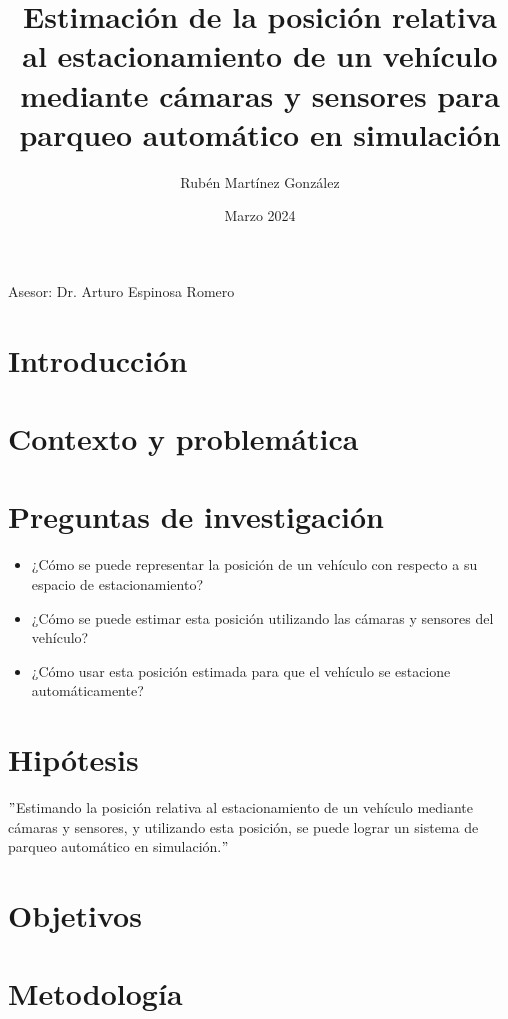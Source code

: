 \documentclass[12pt,letterpaper,final]{article}
\title{Estimación de la posición relativa al estacionamiento de un vehículo mediante cámaras y sensores para parqueo automático en simulación}
\author{Rubén Martínez González}
\date{Marzo 2024}
\begin{document}
    \maketitle
    \begin{center}
        Asesor: Dr. Arturo Espinosa Romero

    \end{center}
    \clearpage

    \section*{Introducción}
    
    \clearpage

    \section*{Contexto y problemática}
    
    \clearpage

    \section*{Preguntas de investigación}
    \begin{itemize}
        \item ¿Cómo se puede representar la posición de un vehículo con respecto a su espacio de estacionamiento?
        \item ¿Cómo se puede estimar esta posición utilizando las cámaras y sensores del vehículo?
        \item ¿Cómo usar esta posición estimada para que el vehículo se estacione automáticamente?
    \end{itemize}

    \section*{Hipótesis}
    \("\)Estimando la posición relativa al estacionamiento de un vehículo mediante cámaras y sensores,
    y utilizando esta posición, se puede lograr un sistema de parqueo automático en simulación.\("\)

    \section*{Objetivos}
    
    \clearpage

    \section*{Metodología}
    \justify
    
\end{document}
